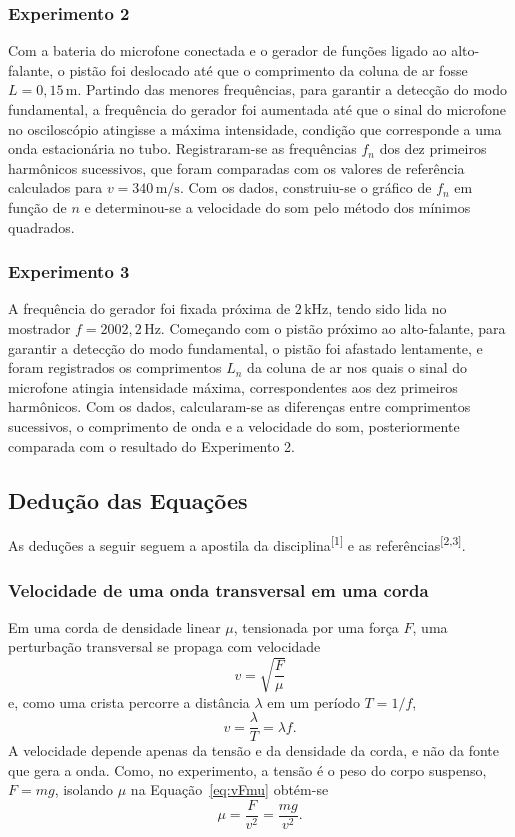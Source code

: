 \documentclass[12pt, a4paper]{article}
\newcommand{\un}[1]{\,\mathrm{#1}}
\newcommand{\cita}[1]{\textsuperscript{[#1]}}
\begin{document}
\subsubsection{Experimento 2}

Com a bateria do microfone conectada e o gerador de funções ligado ao alto-falante, o pistão foi deslocado até que o comprimento da coluna de ar fosse $L=0{,}15\un{m}$. Partindo das menores frequências, para garantir a detecção do modo fundamental, a frequência do gerador foi aumentada até que o sinal do microfone no osciloscópio atingisse a máxima intensidade, condição que corresponde a uma onda estacionária no tubo. Registraram-se as frequências $f_n$ dos dez primeiros harmônicos sucessivos, que foram comparadas com os valores de referência calculados para $v=340\un{m/s}$. Com os dados, construiu-se o gráfico de $f_n$ em função de $n$ e determinou-se a velocidade do som pelo método dos mínimos quadrados.

\subsubsection{Experimento 3}

A frequência do gerador foi fixada próxima de $2\un{kHz}$, tendo sido lida no mostrador $f=2002{,}2\un{Hz}$. Começando com o pistão próximo ao alto-falante, para garantir a detecção do modo fundamental, o pistão foi afastado lentamente, e foram registrados os comprimentos $L_n$ da coluna de ar nos quais o sinal do microfone atingia intensidade máxima, correspondentes aos dez primeiros harmônicos. Com os dados, calcularam-se as diferenças entre comprimentos sucessivos, o comprimento de onda e a velocidade do som, posteriormente comparada com o resultado do Experimento 2.

\subsection{Dedução das Equações}

As deduções a seguir seguem a apostila da disciplina\cita{1} e as referências\cita{2,3}.

\subsubsection{Velocidade de uma onda transversal em uma corda}

Em uma corda de densidade linear $\mu$, tensionada por uma força $F$, uma perturbação transversal se propaga com velocidade
\begin{equation}
v=\sqrt{\frac{F}{\mu}}
\label{eq:vFmu}
\end{equation}
e, como uma crista percorre a distância $\lambda$ em um período $T=1/f$,
\begin{equation}
v=\frac{\lambda}{T}=\lambda f.
\label{eq:vlf}
\end{equation}
A velocidade depende apenas da tensão e da densidade da corda, e não da fonte que gera a onda. Como, no experimento, a tensão é o peso do corpo suspenso, $F=mg$, isolando $\mu$ na Equação~\eqref{eq:vFmu} obtém-se
\begin{equation}
\mu=\frac{F}{v^2}=\frac{mg}{v^2}.
\label{eq:mu}
\end{equation}
\end{document}
